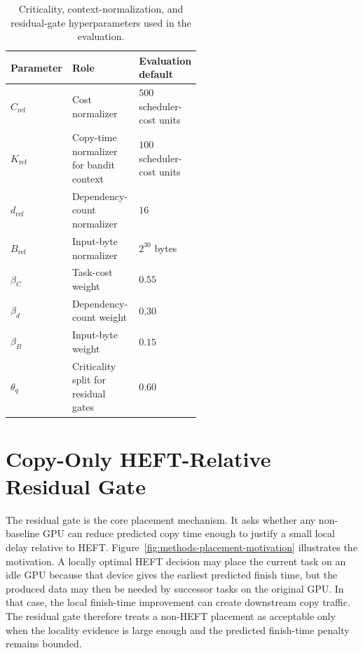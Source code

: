 \begin{table}[t]
\centering
\footnotesize
\begin{tabular}{@{}lp{0.54\linewidth}l@{}}
\toprule
Parameter & Role & Evaluation default \\
\midrule
$C_{\mathrm{ref}}$ & Cost normalizer & $500$ scheduler-cost units \\
$K_{\mathrm{ref}}$ & Copy-time normalizer for bandit context & $100$ scheduler-cost units \\
$d_{\mathrm{ref}}$ & Dependency-count normalizer & $16$ \\
$B_{\mathrm{ref}}$ & Input-byte normalizer & $2^{30}$ bytes \\
$\beta_C$ & Task-cost weight & $0.55$ \\
$\beta_d$ & Dependency-count weight & $0.30$ \\
$\beta_B$ & Input-byte weight & $0.15$ \\
$\theta_q$ & Criticality split for residual gates & $0.60$ \\
\bottomrule
\end{tabular}
\caption{Criticality, context-normalization, and residual-gate hyperparameters used in the evaluation.}
\label{tab:criticality-hyperparameters}
\end{table}

\section{Copy-Only HEFT-Relative Residual Gate}
\label{sec:methods-copy-only-gate}

The residual gate is the core placement mechanism. It asks whether any non-baseline GPU can reduce predicted copy time enough to justify a small local delay relative to HEFT. Figure~\ref{fig:methods-placement-motivation} illustrates the motivation. A locally optimal HEFT decision may place the current task on an idle GPU because that device gives the earliest predicted finish time, but the produced data may then be needed by successor tasks on the original GPU. In that case, the local finish-time improvement can create downstream copy traffic. The residual gate therefore treats a non-HEFT placement as acceptable only when the locality evidence is large enough and the predicted finish-time penalty remains bounded.

\figMethodsPlacementMotivation


